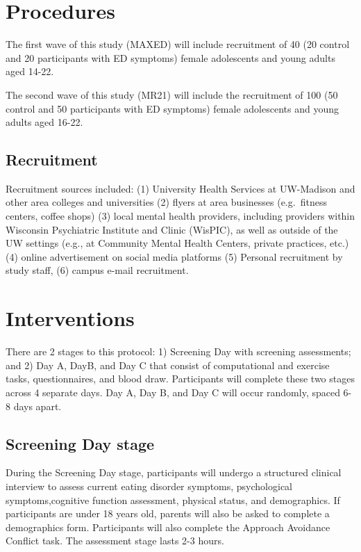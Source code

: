 \documentclass[
]{book}
\begin{document}
\chapter{Procedures}\label{procedures}

The first wave of this study (MAXED) will include recruitment of 40 (20 control and 20 participants with ED symptoms) female adolescents and young adults aged 14-22.

The second wave of this study (MR21) will include the recruitment of 100 (50 control and 50 participants with ED symptoms) female adolescents and young adults aged 16-22.

\section{Recruitment}\label{recruitment}

Recruitment sources included: (1) University Health Services at UW-Madison and other area colleges and universities (2) flyers at area businesses (e.g.~fitness centers, coffee shops) (3) local mental health providers, including providers within Wisconsin Psychiatric Institute and Clinic (WisPIC), as well as outside of the UW settings (e.g., at Community Mental Health Centers, private practices, etc.) (4) online advertisement on social media platforms (5) Personal recruitment by study staff, (6) campus e-mail recruitment.

\chapter{Interventions}\label{interventions}

There are 2 stages to this protocol: 1) Screening Day with screening assessments; and 2) Day A, DayB, and Day C that consist of computational and exercise tasks, questionnaires, and blood draw. Participants will complete these two stages across 4 separate days. Day A, Day B, and Day C will occur randomly, spaced 6-8 days apart.

\section{Screening Day stage}\label{screening-day-stage}

During the Screening Day stage, participants will undergo a structured clinical interview to assess current eating disorder symptoms, psychological symptoms,cognitive function assessment, physical status, and demographics. If participants are under 18 years old, parents will also be asked to complete a demographics form. Participants will also complete the Approach Avoidance Conflict task. The assessment stage lasts 2-3 hours.
\end{document}
